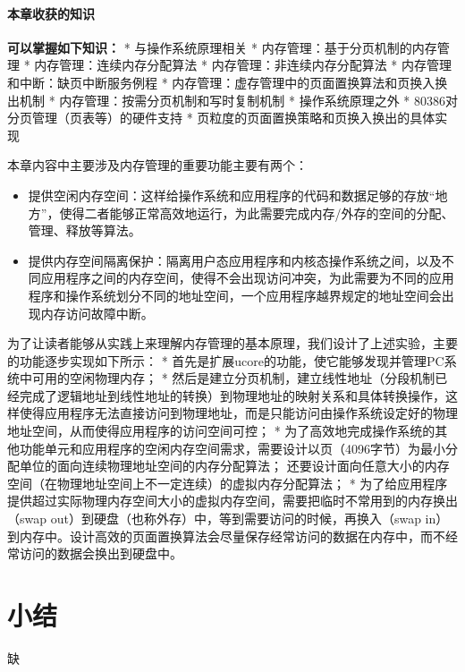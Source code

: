 \paragraph{本章收获的知识}

\textbf{可以掌握如下知识：} * 与操作系统原理相关 *
内存管理：基于分页机制的内存管理 * 内存管理：连续内存分配算法 *
内存管理：非连续内存分配算法 * 内存管理和中断：缺页中断服务例程 *
内存管理：虚存管理中的页面置换算法和页换入换出机制 *
内存管理：按需分页机制和写时复制机制 * 操作系统原理之外 *
80386对分页管理（页表等）的硬件支持 *
页粒度的页面置换策略和页换入换出的具体实现

本章内容中主要涉及内存管理的重要功能主要有两个：

\begin{itemize}
	\item
	提供空闲内存空间：这样给操作系统和应用程序的代码和数据足够的存放``地方''，使得二者能够正常高效地运行，为此需要完成内存/外存的空间的分配、管理、释放等算法。
	\item
	提供内存空间隔离保护：隔离用户态应用程序和内核态操作系统之间，以及不同应用程序之间的内存空间，使得不会出现访问冲突，为此需要为不同的应用程序和操作系统划分不同的地址空间，一个应用程序越界规定的地址空间会出现内存访问故障中断。
\end{itemize}

为了让读者能够从实践上来理解内存管理的基本原理，我们设计了上述实验，主要的功能逐步实现如下所示：
* 首先是扩展ucore的功能，使它能够发现并管理PC系统中可用的空闲物理内存；
*
然后是建立分页机制，建立线性地址（分段机制已经完成了逻辑地址到线性地址的转换）到物理地址的映射关系和具体转换操作，这样使得应用程序无法直接访问到物理地址，而是只能访问由操作系统设定好的物理地址空间，从而使得应用程序的访问空间可控；
*
为了高效地完成操作系统的其他功能单元和应用程序的空闲内存空间需求，需要设计以页（4096字节）为最小分配单位的面向连续物理地址空间的内存分配算法；
还要设计面向任意大小的内存空间（在物理地址空间上不一定连续）的虚拟内存分配算法；
*
为了给应用程序提供超过实际物理内存空间大小的虚拟内存空间，需要把临时不常用到的内存换出（swap
out）到硬盘（也称外存）中，等到需要访问的时候，再换入（swap
in）到内存中。设计高效的页面置换算法会尽量保存经常访问的数据在内存中，而不经常访问的数据会换出到硬盘中。













\section{小结}
缺